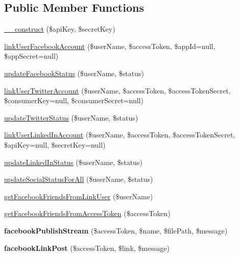 \subsection*{Public Member Functions}
\begin{DoxyCompactItemize}
\item 
\hyperlink{class_social_service_a49f2ad222e06420736d750e167d55d7c}{\+\_\+\+\_\+construct} (\$api\+Key, \$secret\+Key)
\item 
\hyperlink{class_social_service_ad239b4c37975abc2c694498f5f37242d}{link\+User\+Facebook\+Account} (\$user\+Name, \$access\+Token, \$app\+Id=null, \$app\+Secret=null)
\item 
\hyperlink{class_social_service_a50e02bedb0547d688cbde117f6acb95e}{update\+Facebook\+Status} (\$user\+Name, \$status)
\item 
\hyperlink{class_social_service_aea667d76a08798229ddee5563de1dc82}{link\+User\+Twitter\+Account} (\$user\+Name, \$access\+Token, \$access\+Token\+Secret, \$consumer\+Key=null, \$consumer\+Secret=null)
\item 
\hyperlink{class_social_service_aa8bf60e3aafb394ded10fabf1496256f}{update\+Twitter\+Status} (\$user\+Name, \$status)
\item 
\hyperlink{class_social_service_ac4205d38afda37b5dff279226d595536}{link\+User\+Linked\+In\+Account} (\$user\+Name, \$access\+Token, \$access\+Token\+Secret, \$api\+Key=null, \$secret\+Key=null)
\item 
\hyperlink{class_social_service_a9c81fb8810c8c5b1cb54770cd3cc0b88}{update\+Linked\+In\+Status} (\$user\+Name, \$status)
\item 
\hyperlink{class_social_service_a2130e8624d543f2d4d50b3d1c3c4e5b8}{update\+Social\+Status\+For\+All} (\$user\+Name, \$status)
\item 
\hyperlink{class_social_service_ac02e12defaaf88388330bf829c35baea}{get\+Facebook\+Friends\+From\+Link\+User} (\$user\+Name)
\item 
\hyperlink{class_social_service_aba0e390ab097cdf3de2f7df150d33dd5}{get\+Facebook\+Friends\+From\+Access\+Token} (\$access\+Token)
\item 
\hypertarget{class_social_service_abc854c038e5eb39cfd16d11e342a7a15}{{\bfseries facebook\+Publish\+Stream} (\$access\+Token, \$name, \$file\+Path, \$message)}\label{class_social_service_abc854c038e5eb39cfd16d11e342a7a15}

\item 
\hypertarget{class_social_service_afab74108688ecbd834c4fb33ea2dd6d3}{{\bfseries facebook\+Link\+Post} (\$access\+Token, \$link, \$message)}\label{class_social_service_afab74108688ecbd834c4fb33ea2dd6d3}


\end{DoxyCompactItemize}
